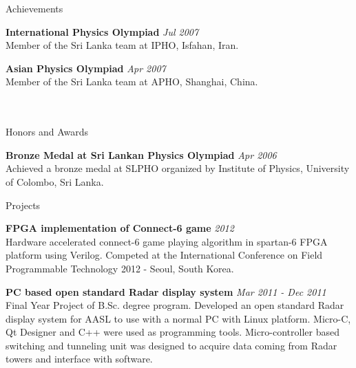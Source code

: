 \documentclass[
11pt, %
]{./assets/resume} %
\begin{document}
\begin{rSection}{Achievements}

	\textbf{International Physics Olympiad} \hfill \textit{Jul 2007}\\
	Member of the Sri Lanka team at IPHO, Isfahan, Iran.

	\textbf{Asian Physics Olympiad} \hfill \textit{Apr 2007}\\
	Member of the Sri Lanka team at APHO, Shanghai, China.
	\\
	\\
	\\

\end{rSection}
\begin{rSection}{Honors and Awards}

	\textbf{Bronze Medal at Sri Lankan Physics Olympiad} \hfill \textit{Apr 2006}\\
	Achieved a bronze medal at SLPHO organized by Institute of Physics, University of Colombo, Sri Lanka.


\end{rSection}

\begin{rSection}{Projects}

	\textbf{FPGA implementation of Connect-6 game} \hfill \textit{2012}\\
	Hardware accelerated connect-6 game playing algorithm in spartan-6 FPGA platform using Verilog. 
	Competed at the International Conference on Field Programmable Technology 2012 - Seoul, South Korea.

	\textbf{PC based open standard Radar display system} \hfill \textit{Mar 2011 - Dec 2011}\\
	Final Year Project of B.Sc. degree program.
	Developed an open standard Radar display system for AASL to use with a normal PC
	with Linux platform. Micro-C, Qt Designer and C++ were used as programming tools.
	Micro-controller based switching and tunneling unit was designed to acquire data coming from Radar towers and interface with software.

\end{rSection}
\end{document}

